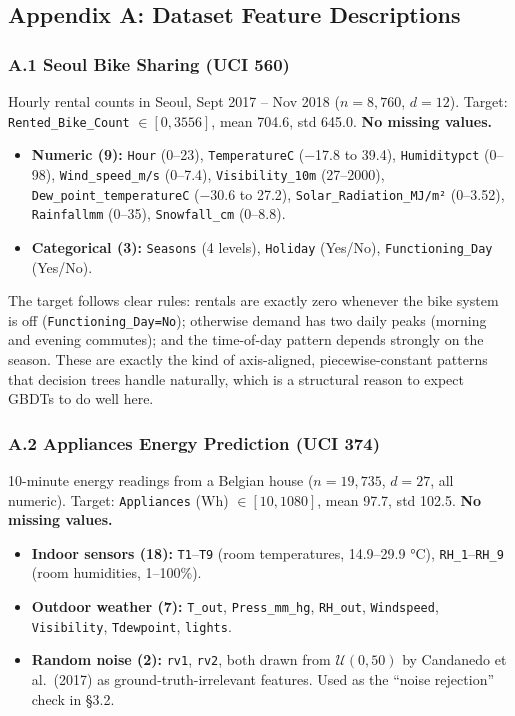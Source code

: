 \documentclass[
  11pt,
  onecolumn]{article}
\providecommand{\tightlist}{%
  \setlength{\itemsep}{0pt}\setlength{\parskip}{0pt}}
\begin{document}
\subsection{Appendix A: Dataset Feature
Descriptions}\label{appendix-a-dataset-feature-descriptions}

\subsubsection{A.1 Seoul Bike Sharing (UCI
560)}\label{a.1-seoul-bike-sharing-uci-560}

Hourly rental counts in Seoul, Sept 2017 -- Nov 2018 (\(n=8{,}760\),
\(d=12\)). Target: \texttt{Rented\_Bike\_Count} \(\in [0, 3556]\), mean
704.6, std 645.0. \textbf{No missing values.}

\begin{itemize}
\tightlist
\item
  \textbf{Numeric (9):} \texttt{Hour} (0--23), \texttt{TemperatureC}
  (−17.8 to 39.4), \texttt{Humiditypct} (0--98),
  \texttt{Wind\_speed\_m/s} (0--7.4), \texttt{Visibility\_10m}
  (27--2000), \texttt{Dew\_point\_temperatureC} (−30.6 to 27.2),
  \texttt{Solar\_Radiation\_MJ/m²} (0--3.52), \texttt{Rainfallmm}
  (0--35), \texttt{Snowfall\_cm} (0--8.8).
\item
  \textbf{Categorical (3):} \texttt{Seasons} (4 levels),
  \texttt{Holiday} (Yes/No), \texttt{Functioning\_Day} (Yes/No).
\end{itemize}

The target follows clear rules: rentals are exactly zero whenever the
bike system is off (\texttt{Functioning\_Day=No}); otherwise demand has
two daily peaks (morning and evening commutes); and the time-of-day
pattern depends strongly on the season. These are exactly the kind of
axis-aligned, piecewise-constant patterns that decision trees handle
naturally, which is a structural reason to expect GBDTs to do well here.

\subsubsection{A.2 Appliances Energy Prediction (UCI
374)}\label{a.2-appliances-energy-prediction-uci-374}

10-minute energy readings from a Belgian house (\(n=19{,}735\),
\(d=27\), all numeric). Target: \texttt{Appliances} (Wh)
\(\in [10, 1080]\), mean 97.7, std 102.5. \textbf{No missing values.}

\begin{itemize}
\tightlist
\item
  \textbf{Indoor sensors (18):} \texttt{T1}--\texttt{T9} (room
  temperatures, 14.9--29.9 °C), \texttt{RH\_1}--\texttt{RH\_9} (room
  humidities, 1--100\%).
\item
  \textbf{Outdoor weather (7):} \texttt{T\_out}, \texttt{Press\_mm\_hg},
  \texttt{RH\_out}, \texttt{Windspeed}, \texttt{Visibility},
  \texttt{Tdewpoint}, \texttt{lights}.
\item
  \textbf{Random noise (2):} \texttt{rv1}, \texttt{rv2}, both drawn from
  \(\mathcal{U}(0, 50)\) by Candanedo et al.~(2017) as
  ground-truth-irrelevant features. Used as the ``noise rejection''
  check in §3.2.
\end{itemize}
\end{document}
